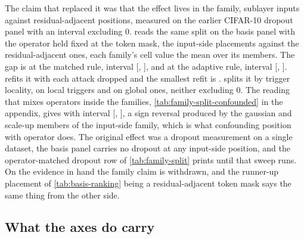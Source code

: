 \documentclass[../main.tex]{subfiles}
\begin{document}
The claim that replaced it was that the effect lives in the family, sublayer inputs against residual-adjacent positions, measured on the earlier CIFAR-10 dropout panel with an interval excluding $0$.  reads the same split on the basis panel with the operator held fixed at the token mask, the input-side placements against the residual-adjacent ones, each family's cell value the mean over its members. The gap is \FamilyGapMatched{} at the matched rule, interval [\FamilyGapMatchedLow{}, \FamilyGapMatchedHigh{}], and \FamilyGapAdaptive{} at the adaptive rule, interval [\FamilyGapAdaptiveLow{}, \FamilyGapAdaptiveHigh{}].  refits it with each attack dropped and the smallest refit is \FamilyGapMinLeaveOneAttackOut{}.  splits it by trigger locality, \FamilyGapLocal{} on local triggers and \FamilyGapGlobal{} on global ones, neither excluding $0$. The reading that mixes operators inside the families, \cref{tab:family-split-confounded} in the appendix, gives \FamilyGapConfoundedMatched{} with interval [\FamilyGapConfoundedMatchedLow{}, \FamilyGapConfoundedMatchedHigh{}], a sign reversal produced by the gaussian and scale-up members of the input-side family, which is what confounding position with operator does. The original effect was a dropout measurement on a single dataset, the basis panel carries no dropout at any input-side position, and the operator-matched dropout row of \cref{tab:family-split} prints \pending{} until that sweep runs. On the evidence in hand the family claim is withdrawn, and the runner-up placement of \cref{tab:basis-ranking} being a residual-adjacent token mask says the same thing from the other side.





\subsection{What the axes do carry}
\end{document}

